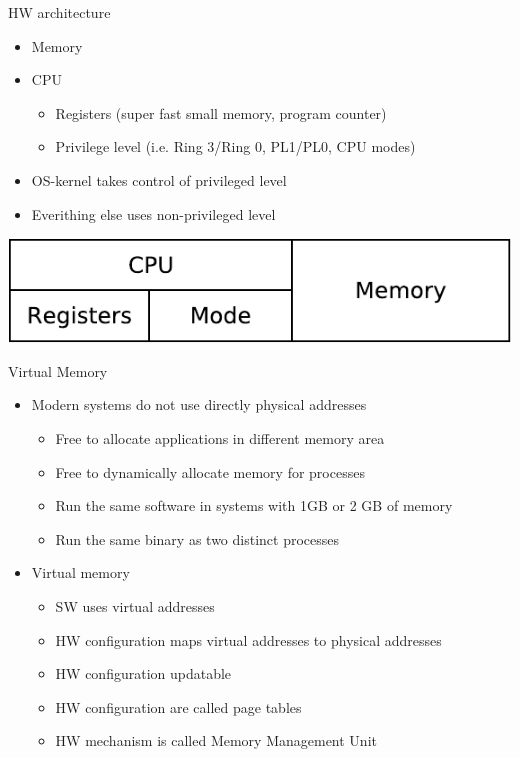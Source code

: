 \documentclass{beamer}
\begin{document}
\begin{frame}{HW architecture}
  \begin{itemize}
  \item Memory
  \item CPU
    \begin{itemize}
    \item Registers (super fast small memory, program counter)
    \item Privilege level (i.e. Ring 3/Ring 0, PL1/PL0, CPU modes)
    \end{itemize}
  \item OS-kernel takes control of privileged level
  \item Everithing else uses non-privileged level
  \end{itemize}
  \includegraphics[width=0.5\linewidth]{hw}
\end{frame}

\begin{frame}{Virtual Memory}
  \begin{itemize}
  \item Modern systems do not use directly physical addresses
    \begin{itemize}
    \item Free to allocate applications in different memory area
    \item Free to dynamically allocate memory for processes
    \item Run the same software in systems with 1GB or 2 GB of memory
    \item Run the same binary as two distinct processes
    \end{itemize}
  \item Virtual memory
    \begin{itemize}
    \item SW uses virtual addresses
    \item HW configuration maps virtual addresses to physical addresses
    \item HW configuration updatable
    \item HW configuration are called page tables
    \item HW mechanism is called Memory Management Unit
    \end{itemize}
  \end{itemize}
\end{frame}
\end{document}
